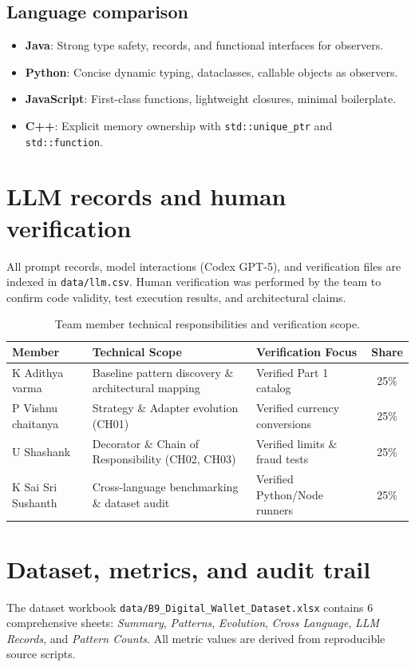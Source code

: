 \documentclass[11pt,a4paper]{article}
\begin{document}
\subsection{Language comparison}
\begin{itemize}[noitemsep]
    \item \textbf{Java}: Strong type safety, records, and functional interfaces for observers.
    \item \textbf{Python}: Concise dynamic typing, dataclasses, callable objects as observers.
    \item \textbf{JavaScript}: First-class functions, lightweight closures, minimal boilerplate.
    \item \textbf{C++}: Explicit memory ownership with \texttt{std::unique\_ptr} and \texttt{std::function}.
\end{itemize}

\section{LLM records and human verification}
All prompt records, model interactions (Codex GPT-5), and verification files are indexed in \texttt{data/llm.csv}. Human verification was performed by the team to confirm code validity, test execution results, and architectural claims.

\begin{table}[h!]
\centering
\small
\begin{tabularx}{\textwidth}{p{3.5cm}Xlc}
\toprule
\textbf{Member} & \textbf{Technical Scope} & \textbf{Verification Focus} & \textbf{Share} \\
\midrule
K Adithya varma & Baseline pattern discovery \& architectural mapping & Verified Part 1 catalog & 25\% \\
P Vishnu chaitanya & Strategy \& Adapter evolution (CH01) & Verified currency conversions & 25\% \\
U Shashank & Decorator \& Chain of Responsibility (CH02, CH03) & Verified limits \& fraud tests & 25\% \\
K Sai Sri Sushanth & Cross-language benchmarking \& dataset audit & Verified Python/Node runners & 25\% \\
\bottomrule
\end{tabularx}
\caption{Team member technical responsibilities and verification scope.}
\end{table}

\section{Dataset, metrics, and audit trail}
The dataset workbook \texttt{data/B9_Digital_Wallet_Dataset.xlsx} contains 6 comprehensive sheets: \textit{Summary}, \textit{Patterns}, \textit{Evolution}, \textit{Cross Language}, \textit{LLM Records}, and \textit{Pattern Counts}. All metric values are derived from reproducible source scripts.
\end{document}
